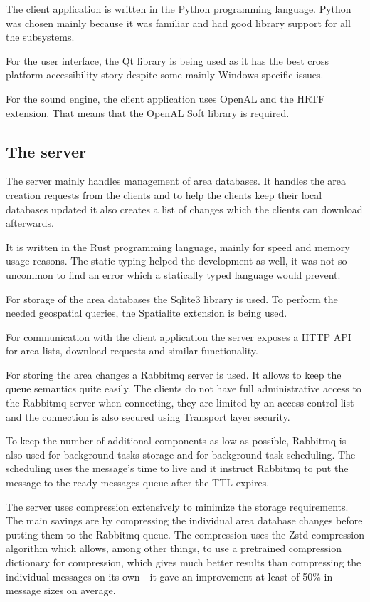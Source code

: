 \documentclass[nolof,digital]{fithesis3}
\begin{document}
The client application is written in the Python programming language. Python was chosen mainly because it was familiar and had good library support for all the subsystems.

For the user interface, the Qt library is being used as it has the best cross platform accessibility story despite some mainly Windows specific issues.

For the sound engine, the client application uses OpenAL and the HRTF extension. That means that the OpenAL Soft library is required.
\subsection{The server}
The server mainly handles management of area databases. It handles the area creation requests from the clients and to help the clients keep their local databases updated it also creates a list of changes which the clients can download afterwards.

It is written in the Rust programming language, mainly for speed and memory usage reasons. The static typing helped the development as well, it was not so uncommon to find an error which a statically typed language would prevent.

For storage of the area databases the Sqlite3 library is used. To perform the needed geospatial queries, the Spatialite extension is being used.

For communication with the client application the server exposes a HTTP API for area lists, download requests and similar functionality. 

For storing the area changes a Rabbitmq server is used. It allows to keep the queue semantics quite easily. The clients do not have full administrative access to the Rabbitmq server when connecting, they are limited by an access control list and the connection is also secured using Transport layer security.

To keep the number of additional components as low as possible, Rabbitmq is also used for background tasks storage and for background task scheduling. The scheduling uses the message's time to live and it instruct Rabbitmq to put the message to the ready messages queue after the TTL expires.

The server uses compression extensively to minimize the storage requirements. The main savings are by compressing the individual area database changes before putting them to the Rabbitmq queue. The compression uses the Zstd compression algorithm which allows, among other things, to use a pretrained compression dictionary for compression, which gives much better results than compressing the individual messages on its own - it gave an improvement at least of 50\% in message sizes on average.
\end{document}
